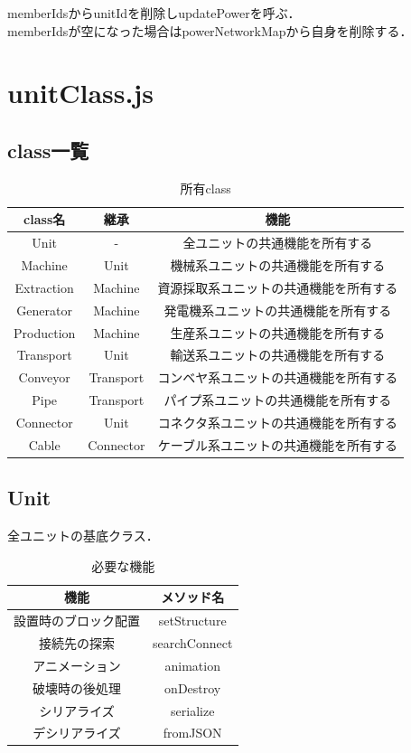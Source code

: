 \documentclass[uplatex,dvipdfmx,report]{jlreq}
\begin{document}
memberIdsからunitIdを削除しupdatePowerを呼ぶ．\\
memberIdsが空になった場合はpowerNetworkMapから自身を削除する．

\section{unitClass.js}

\subsection{class一覧}
\begin{table}[H]
    \centering
    \caption{所有class}
    \begin{tabular}{ccc}
        \hline
        class名 & 継承 & 機能 \\
        \hline
        \hline
        Unit & - & 全ユニットの共通機能を所有する \\
        Machine & Unit & 機械系ユニットの共通機能を所有する \\
        Extraction & Machine & 資源採取系ユニットの共通機能を所有する \\
        Generator & Machine & 発電機系ユニットの共通機能を所有する \\
        Production & Machine & 生産系ユニットの共通機能を所有する \\
        Transport & Unit & 輸送系ユニットの共通機能を所有する \\
        Conveyor & Transport & コンベヤ系ユニットの共通機能を所有する \\
        Pipe & Transport & パイプ系ユニットの共通機能を所有する \\
        Connector & Unit & コネクタ系ユニットの共通機能を所有する \\
        Cable & Connector & ケーブル系ユニットの共通機能を所有する \\
        \hline
    \end{tabular}
\end{table}

\subsection{Unit}

全ユニットの基底クラス．

\begin{table}[H]
    \centering
    \caption{必要な機能}
    \begin{tabular}{cc}
        \hline
        機能 & メソッド名 \\
        \hline
        \hline
        設置時のブロック配置 & setStructure \\
        接続先の探索 & searchConnect \\
        アニメーション & animation \\
        破壊時の後処理 & onDestroy \\
        シリアライズ & serialize \\
        デシリアライズ & fromJSON \\
        \hline
    \end{tabular}
\end{table}
\end{document}
